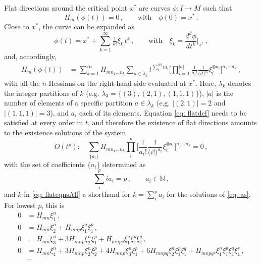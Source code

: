 \documentclass[11pt]{article}
\begin{document}
Flat directions around the critical point $x^*$ are curves $\phi: I\rightarrow M$ such that
%
\begin{equation}	\label{eq: flatdef}
	H_{m}(\phi(t))=0\,,	\qquad\text{with}\quad
	\phi(0)=x^*\,.
\end{equation}
%
Close to $x^*$, the curve can be expanded as
%
\begin{equation}	\label{eq: phiSeries}
	\phi(t)=x^*+\sum_{k=1}^{\infty}\tfrac1{k!}\xi_k\, t^k\,, \qquad\text{with}\quad
	\xi_k=\frac{d^k\phi}{dt^k}\Big\vert_{x^*}\,,
\end{equation}
%
and, accordingly,
%
\begin{equation}
	\begin{aligned}
		H_{m}(\phi(t))&=\sum_{k=1}^{\infty}H_{mn_1\dots n_k}\sum_{a\in\lambda_k}t^{\sum_i^{\vert a\vert}i a_i}\bigg[\prod_{i=1}^{\vert a\vert}\frac1{a_i!}\frac{1}{\big(i!\big)^{a_i}}\xi_i^{\otimes a_i}\bigg]^{n_1\dots n_k}\,,
	\end{aligned}
\end{equation}
%
with all the $n$-Hessians on the right-hand side evaluated at $x^*$. Here, $\lambda_k$ denotes the integer partitions of $k$ (e.g. $\lambda_3=\{(3),(2,1),(1,1,1)\}$), $\vert a\vert$ is the number of elements of a specific partition $a\in\lambda_k$ (e.g. $\vert(2,1)\vert=2$ and $\vert(1,1,1)\vert=3$), and $a_i$ each of its elements. Equation \eqref{eq: flatdef} needs to be satisfied at every order in $t$, and therefore the existence of flat directions amounts to the existence solutions of the system
%
\begin{equation}	\label{eq: flateqnsAll}
	O(t^p):\quad\sum_{\{a_i\}}H_{mn_1\dots n_{k}}\prod_i^{p}\bigg[\frac1{a_i!}\frac1{\big(i!\big)^{a_i}}\xi_i^{\otimes a_i}\bigg]^{n_1\dots n_k}=0\,,
\end{equation}
%
with the set of coefficients $\{a_i\}$ determined as
%
\begin{equation}	\label{eq: as}
	\sum_i^{p}i a_i=p\,, 	\qquad
	a_i\in \mathbb{N}\,,
\end{equation}
%
and $k$ in \eqref{eq: flateqnsAll} a shorthand for $k=\sum_i^p a_i$ for the solutions of \eqref{eq: as}.
For lowest $p$, this is
%
\begin{equation}	\label{eq: flateqns}
	\begin{aligned}
		0&=H_{mn}\xi_1^n\,,		\\[5pt]
		0&=H_{mn}\xi_2^n+H_{mnp}\xi_1^n\xi_1^p\,,	\\[5pt]
		0&=H_{mn}\xi_3^n+3H_{mnp}\xi_2^n\xi_1^p+H_{mnpq}\xi_1^n\xi_1^p\xi_1^q\,,	\\[5pt]
		0&=H_{mn}\xi_4^n+3H_{mnp}\xi_2^n\xi_2^p+4H_{mnp}\xi_3^n\xi_1^p+6H_{mnpq}\xi_2^n\xi_1^p\xi_1^q+H_{mnpqr}\xi_1^n\xi_1^p\xi_1^q\xi_1^r\,,	\\[5pt]
		&\dots
	\end{aligned}
\end{equation}
%
\end{document}

